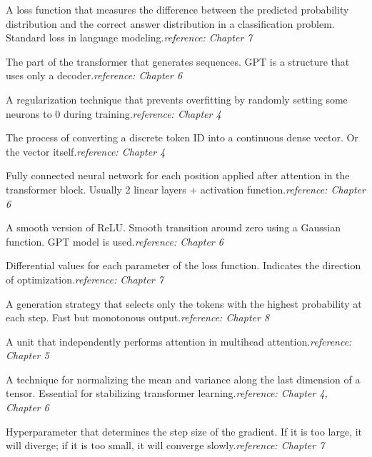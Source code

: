 \begin{description}[leftmargin=2.5em, style=nextline, font=\bfseries\sffamily\color{inkblue}]
\item [Cross-Entropy Loss]
A loss function that measures the difference between the predicted probability distribution and the correct answer distribution in a classification problem. Standard loss in language modeling.\textit{reference: Chapter 7}

\item [Decoder]
The part of the transformer that generates sequences. GPT is a structure that uses only a decoder.\textit{reference: Chapter 6}

\item [Dropout]
A regularization technique that prevents overfitting by randomly setting some neurons to 0 during training.\textit{reference: Chapter 4}

\item [Embedding]
The process of converting a discrete token ID into a continuous dense vector. Or the vector itself.\textit{reference: Chapter 4}

\item [Feed-Forward Network (FFN)]
Fully connected neural network for each position applied after attention in the transformer block. Usually 2 linear layers + activation function.\textit{reference: Chapter 6}

\item [GELU (Gaussian Error Linear Unit)]
A smooth version of ReLU. Smooth transition around zero using a Gaussian function. GPT model is used.\textit{reference: Chapter 6}

\item [Gradient]
Differential values ​​for each parameter of the loss function. Indicates the direction of optimization.\textit{reference: Chapter 7}

\item [Greedy Decoding]
A generation strategy that selects only the tokens with the highest probability at each step. Fast but monotonous output.\textit{reference: Chapter 8}

\item [Head]
A unit that independently performs attention in multihead attention.\textit{reference: Chapter 5}

\item [Layer Normalization]
A technique for normalizing the mean and variance along the last dimension of a tensor. Essential for stabilizing transformer learning.\textit{reference: Chapter 4, Chapter 6}

\item [Learning Rate]
Hyperparameter that determines the step size of the gradient. If it is too large, it will diverge; if it is too small, it will converge slowly.\textit{reference: Chapter 7}


\end{description}
